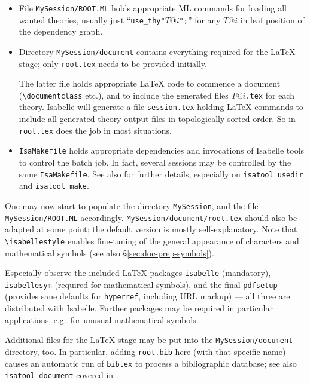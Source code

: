 \begin{isabellebody}
\begin{isamarkuptext}
\begin{itemize}
  \item File \texttt{MySession/ROOT.ML} holds appropriate ML commands
  for loading all wanted theories, usually just
  ``\texttt{use_thy"$T@i$";}'' for any $T@i$ in leaf position of the
  dependency graph.

  \item Directory \texttt{MySession/document} contains everything
  required for the {\LaTeX} stage; only \texttt{root.tex} needs to be
  provided initially.

  The latter file holds appropriate {\LaTeX} code to commence a
  document (\verb,\documentclass, etc.), and to include the generated
  files $T@i$\texttt{.tex} for each theory.  Isabelle will generate a
  file \texttt{session.tex} holding {\LaTeX} commands to include all
  generated theory output files in topologically sorted order.  So
  \verb,, in \texttt{root.tex} does the job in most
  situations.

  \item \texttt{IsaMakefile} holds appropriate dependencies and
  invocations of Isabelle tools to control the batch job.  In fact,
  several sessions may be controlled by the same \texttt{IsaMakefile}.
  See also \cite{isabelle-sys} for further details, especially on
  \texttt{isatool usedir} and \texttt{isatool make}.

  \end{itemize}

  One may now start to populate the directory \texttt{MySession}, and
  the file \texttt{MySession/ROOT.ML} accordingly.
  \texttt{MySession/document/root.tex} should also be adapted at some
  point; the default version is mostly self-explanatory.  Note that
  \verb,\isabellestyle, enables fine-tuning of the general appearance
  of characters and mathematical symbols (see also
  \S\ref{sec:doc-prep-symbols}).

  Especially observe the included {\LaTeX} packages \texttt{isabelle}
  (mandatory), \texttt{isabellesym} (required for mathematical
  symbols), and the final \texttt{pdfsetup} (provides sane defaults
  for \texttt{hyperref}, including URL markup) --- all three are
  distributed with Isabelle. Further packages may be required in
  particular applications, e.g.\ for unusual mathematical symbols.

  \medskip Additional files for the {\LaTeX} stage may be put into the
  \texttt{MySession/document} directory, too.  In particular, adding
  \texttt{root.bib} here (with that specific name) causes an automatic
  run of \texttt{bibtex} to process a bibliographic database; see also
  \texttt{isatool document} covered in \cite{isabelle-sys}.


\end{isamarkuptext}
\end{isabellebody}
